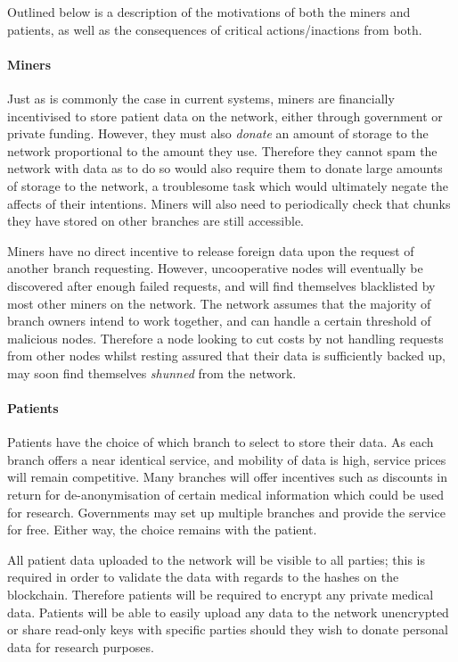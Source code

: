 \documentclass[]{article}
\let\oldparagraph\paragraph
\renewcommand{\paragraph}[1]{\oldparagraph{#1}\mbox{}}
\begin{document}
Outlined below is a description of the motivations of both the miners
and patients, as well as the consequences of critical actions/inactions
from both.

\hypertarget{header-n90}{%
\paragraph{Miners}\label{header-n90}}

Just as is commonly the case in current systems, miners are financially
incentivised to store patient data on the network, either through
government or private funding. However, they must also \emph{donate} an
amount of storage to the network proportional to the amount they use.
Therefore they cannot spam the network with data as to do so would also
require them to donate large amounts of storage to the network, a
troublesome task which would ultimately negate the affects of their
intentions. Miners will also need to periodically check that chunks they
have stored on other branches are still accessible.

Miners have no direct incentive to release foreign data upon the request
of another branch requesting. However, uncooperative nodes will
eventually be discovered after enough failed requests, and will find
themselves blacklisted by most other miners on the network. The network
assumes that the majority of branch owners intend to work together, and
can handle a certain threshold of malicious nodes. Therefore a node
looking to cut costs by not handling requests from other nodes whilst
resting assured that their data is sufficiently backed up, may soon find
themselves \emph{shunned} from the network.

\hypertarget{header-n93}{%
\paragraph{Patients}\label{header-n93}}

Patients have the choice of which branch to select to store their data.
As each branch offers a near identical service, and mobility of data is
high, service prices will remain competitive. Many branches will offer
incentives such as discounts in return for de-anonymisation of certain
medical information which could be used for research. Governments may
set up multiple branches and provide the service for free. Either way,
the choice remains with the patient.

All patient data uploaded to the network will be visible to all parties;
this is required in order to validate the data with regards to the
hashes on the blockchain. Therefore patients will be required to encrypt
any private medical data. Patients will be able to easily upload any
data to the network unencrypted or share read-only keys with specific
parties should they wish to donate personal data for research purposes.
\end{document}
